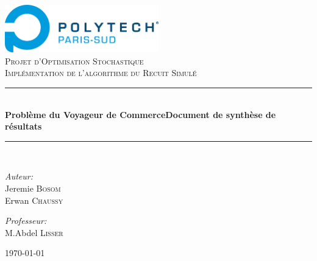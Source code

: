 \newcommand{\HRule}{\rule{\linewidth}{0.5mm}}

\begin{titlepage}
\begin{center}

\includegraphics[width=0.5\textwidth]{../polytech}~\\[1cm]

\textsc{\LARGE Projet d'Optimisation Stochastique}\\[1.5cm]

\textsc{\Large Implémentation de l'algorithme du Recuit Simulé}\\[0.5cm]

\HRule \\[0.4cm]
{ \huge \bfseries Problème du Voyageur de Commerce\newline Document de synthèse de résultats\\[0.4cm] }
\HRule \\[1.5cm]

\begin{minipage}{0.4\textwidth}
\begin{flushleft} \large
\emph{Auteur:}\\
Jeremie \textsc{Bosom}\\
Erwan \textsc{Chaussy}
\end{flushleft}
\end{minipage}
\begin{minipage}{0.4\textwidth}
\begin{flushright} \large
\emph{Professeur:} \\
M.Abdel \textsc{Lisser}
\end{flushright}
\end{minipage}

\vfill

{\large \today}

\end{center}
\end{titlepage}
